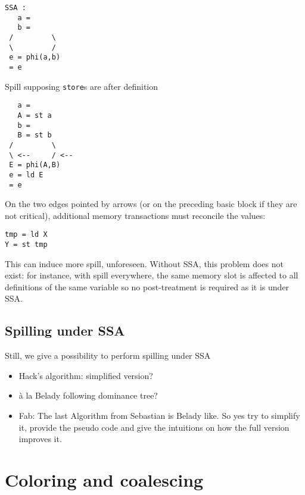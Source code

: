 {\begin{minipage}{.45\textwidth}
\begin{verbatim}
SSA :
   a =
   b =
 /         \
 \         /
 e = phi(a,b)
 = e
\end{verbatim}
\end{minipage}
\begin{minipage}{.45\textwidth}
Spill supposing {\tt store}s are after definition
\begin{verbatim}
   a =
   A = st a
   b =
   B = st b
 /         \
 \ <--     / <--
 E = phi(A,B)
 e = ld E
 = e
\end{verbatim}
\end{minipage}

On the two edges pointed by arrows (or on the preceding basic block if they are 
not critical), additional memory transactions must reconcile the values:
\begin{verbatim}
tmp = ld X
Y = st tmp
\end{verbatim}

This can induce more spill, unforeseen.
Without SSA, this problem does not exist: for instance, with spill everywhere, 
the same memory slot is affected to all definitions of the same variable so no 
post-treatment is required as it is under SSA.



\subsection{Spilling under SSA}
Still, we give a possibility to perform spilling under SSA
\begin{itemize}
  \item Hack's algorithm: simplified version?
  \item \`a la Belady following dominance tree?

  \item Fab: The last Algorithm from Sebastian is Belady like. So yes try to simplify it, provide the pseudo code and give the intuitions on how the full version improves it.

\end{itemize}


\cite{Braun09:spilling-ssa}


\section{Coloring and coalescing}
}

